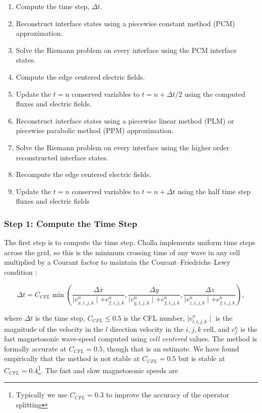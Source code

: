 \documentclass[modern, linenumbers]{aastex631}
\begin{document}
\begin{enumerate}
    \item Compute the time step, $\Delta t$.
    \item Reconstruct interface states using a piecewise constant method (PCM) approximation.
    \item Solve the Riemann problem on every interface using the PCM interface states.
    \item Compute the edge centered electric fields.
    \item Update the $t=n$ conserved variables to $t=n+\Delta t/2$ using the computed fluxes and electric fields.
    \item Reconstruct interface states using a piecewise linear method (PLM) or piecewise parabolic method (PPM) approximation.
    \item Solve the Riemann problem on every interface using the higher order reconstructed interface states.
    \item Recompute the edge centered electric fields.
    \item Update the $t=n$ conserved variables to $t=n+\Delta t$ using the half time step fluxes and electric fields
\end{enumerate}


\subsubsection{Step 1: Compute the Time Step}
\label{vlct:dt}

The first step is to compute the time step. Cholla implements uniform time steps across the grid, so this is the minimum crossing time of any wave in any cell multiplied by a Courant factor to maintain the Courant–Friedrichs–Lewy condition \cite{cfl}:

\begin{equation}
        \label{eqn:dt}
        \Delta t = C_{CFL} \min \left(
            \frac{\Delta x}{\mid v^n_{x,i,j,k} \mid + c^n_{f,i,j,k}},
            \frac{\Delta y}{\mid v^n_{y,i,j,k} \mid + c^n_{f,i,j,k}},
            \frac{\Delta z}{\mid v^n_{z,i,j,k} \mid + c^n_{f,i,j,k}}
        \right),
\end{equation}

\noindent where $\Delta t$ is the time step, $C_{CFL} \leq 0.5$ is the CFL number, $\mid v^n_{l,i,j,k}\mid $ is the magnitude of the velocity in the $l$ direction velocity in the ${i,j,k}$ cell, and $c^n_f $ is the fast magnetosonic wave-speed computed using \emph{cell centered} values. The method is formally accurate at $C_{CFL} = 0.5$, though that is an estimate\citep{stone_2009}. We have found empirically that the method is not stable at $C_{CFL} = 0.5$ but is stable at $C_{CFL} = 0.4$\footnote{Typically we use $C_{CFL} = 0.3$ to improve the accuracy of the operator splitting}. The fast and slow magnetosonic speeds are
\end{document}
